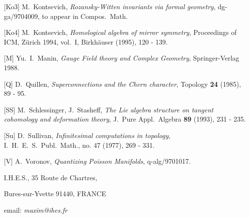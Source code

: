   \item{ [Ko3] } M.~Kontsevich, {\sl
  Rozansky-Witten invariants via formal geometry},
    dg-ga/9704009, to appear in Compos.\ Math.
    
    \item{[Ko4]} M.~Kontsevich, {\sl Homological algebra of mirror symmetry},
 Proceedings of ICM, Z\"urich 1994, vol.\ I, Birkh\"auser (1995), 120 - 139.
 
   
   \item{[M] }Yu.~I.~Manin, {\sl Gauge Field theory and Complex Geometry},
    Springer-Verlag 1988.
   
  \item{ [Q] } D.~Quillen, {\sl Superconnections and the
   Chern character}, Topology {\bf 24} (1985), 89 - 95.
    
   
\item{[SS]} M.~Schlessinger, J.~Stasheff, {\sl The Lie algebra structure 
on tangent cohomology and deformation theory}, J.\ Pure Appl.\ Algebra {\bf 89}
 (1993), 231 - 235.

\item{[Su]} D.~Sullivan, {\sl Infinitesimal computations in topology}, 
I.\ H.\ E.\ S.\ Publ.\ Math.,
  no. 47 (1977), 269 - 331.
 
 
 \item{[V]} A.~Voronov, {\sl Quantizing Poisson Manifolds}, q-alg/9701017.



\vskip 2cm

I.H.E.S., 35 Route de Chartres,

Bures-sur-Yvette 91440, FRANCE

\medskip

email: {\it maxim@ihes.fr}
 
   
                      
               
             
             
              
             
           
  
       
       
    
                                           
         
         
        
